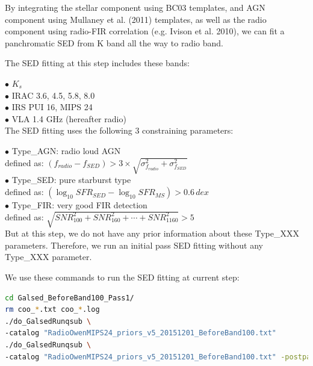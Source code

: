 \documentclass[11pt,a4paper]{article}
\begin{document}
By integrating the stellar component using BC03 templates, and AGN component using Mullaney et al. (2011) templates, as well as the radio component using radio-FIR correlation (e.g. Ivison et al. 2010), we can fit a panchromatic SED from K band all the way to radio band. 

The SED fitting at this step includes these bands: 

\indent\hspace{15pt}$\bullet$ $K_s$
\\
\indent\hspace{15pt}$\bullet$ IRAC 3.6, 4.5, 5.8, 8.0
\\
\indent\hspace{15pt}$\bullet$ IRS PUI 16, MIPS 24
\\
\indent\hspace{15pt}$\bullet$ VLA 1.4 GHz (hereafter radio) 
\\

The SED fitting uses the following 3 constraining parameters: 

\indent\hspace{15pt}$\bullet$ 
Type\_AGN: radio loud AGN
\\[5pt]
\indent\hspace{45pt}
defined as: $(f_{radio}-f_{SED}) > 3\times\sqrt{\sigma_{f_{radio}}^2+\sigma_{f_{SED}}^2}$
\\[5pt]
\indent\hspace{15pt}$\bullet$ 
Type\_SED: pure starburst type
\\[5pt]
\indent\hspace{45pt}
defined as: $\left( \log_{10}{SFR_{SED}} -\log_{10}{{SFR}_{MS}} \right) > 0.6 \,dex$
\\[5pt]
\indent\hspace{15pt}$\bullet$ 
Type\_FIR: very good FIR detection
\\[5pt]
\indent\hspace{45pt}
defined as: $\sqrt{SNR_{100}^2+SNR_{160}^2+\cdots+SNR_{1160}^2}>5$
\\

But at this step, we do not have any prior information about these Type\_XXX parameters. 
Therefore, we run an initial pass SED fitting without any Type\_XXX parameter. 

We use these commands to run the SED fitting at current step:

\begin{lstlisting}[language=bash]
cd Galsed_BeforeBand100_Pass1/
rm coo_*.txt coo_*.log
./do_GalsedRunqsub \
-catalog "RadioOwenMIPS24_priors_v5_20151201_BeforeBand100.txt"
./do_GalsedRunqsub \
-catalog "RadioOwenMIPS24_priors_v5_20151201_BeforeBand100.txt" -postparallel
\end{lstlisting}
\end{document}
